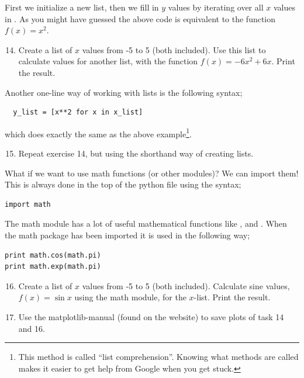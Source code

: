 \documentclass{article}
\begin{document}
First we initialize a new list,
then we fill in $y$ values by iterating over
all $x$ values in .
As you might have guessed the above code is equivalent to 
the function $f(x) = x^2$.\\

\begin{enumerate}
  \setcounter{enumi}{13}
  \item Create a list of $x$ values from -5 to 5 (both included). Use this list
    to calculate values for another list, with the function $f(x) = -6x^2 + 6x$.
    Print the result.

\end{enumerate}

Another one-line way of working with lists is the following syntax;

\begin{lstlisting}
  y_list = [x**2 for x in x_list]
\end{lstlisting}

which does exactly the same as the above example\footnote{This method is
called ``list comprehension''. Knowing what methods are called makes
it easier to get help from Google when you get stuck. }.

\begin{enumerate}
  \setcounter{enumi}{14}
  \item Repeat exercise 14, but using the shorthand way of creating lists.
\end{enumerate}

What if we want to use math functions (or other modules)?
We can import them! This is always done in the top of the
python file using the syntax;

\begin{lstlisting}
import math
\end{lstlisting}

The math module has a lot of useful mathematical functions like ,
 and . When the math package has been imported it is used
in the following way;

\begin{lstlisting}
print math.cos(math.pi)
print math.exp(math.pi)
\end{lstlisting}

\begin{enumerate}
  \setcounter{enumi}{15}
  \item Create a list of $x$ values from -5 to 5 (both included).
    Calculate sine values, $f(x) = \sin{x}$ using the math module,
    for the $x$-list.
    Print the result.
  \item Use the matplotlib-manual (found on the website) to save plots of 
    task 14 and 16.
\end{enumerate}
\end{document}
